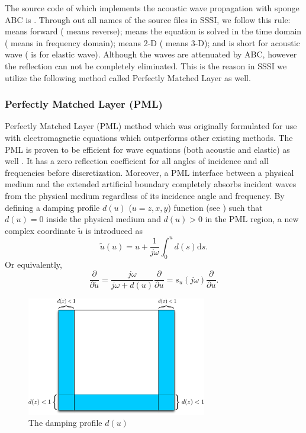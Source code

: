 \documentclass[11pt]{article}
\theoremstyle{plain}
\theoremstyle{definition}
\theoremstyle{remark}
\numberwithin{equation}{section}
\begin{document}
The source code of which implements the acoustic wave propagation with sponge ABC 
is . Through out all names of the source files in SSSI,  we follow this rule:  means forward ( means reverse);  means the equation is solved in the time domain ( means in frequency domain);  means 2-D ( means 3-D); and  is short
 for acoustic wave ( is for elastic wave).  Although the waves are attenuated by ABC, however the reflection can not be completely eliminated. This is the reason in SSSI we utilize the following method called Perfectly Matched Layer as well. 



\subsubsection{Perfectly Matched Layer (PML)}
 Perfectly Matched Layer (PML) method which was originally formulated for use with electromagnetic equations which outperforms other existing methods. The PML is proven to be efficient for wave equations (both acoustic and elastic) as well \cite{Komatitsch:2007aa}. It has a zero reflection coefficient for all angles of incidence and all frequencies before discretization. Moreover, a PML interface between a physical medium and the extended artificial boundary completely absorbs incident waves from the physical medium regardless of its incidence angle and frequency.
By defining a damping profile $d(u)$ ($u=z, x, y$) function (see ) such that $d(u) = 0$ inside the physical medium and $d(u) > 0$ in the PML region, a new complex coordinate $\tilde{u}$ is introduced as
  \begin{equation}
  \label{eq:replace}
  \tilde{u}(u) = u + \frac{1}{j\omega}\int_0^u d(s)\mathrm{d}s.
  \end{equation}
Or equivalently,
  \begin{equation}
  \frac{\partial}{\partial \tilde{u}} = \frac{j\omega}{j\omega + d(u)}\frac{\partial}{\partial u} = s_u(j\omega)\frac{\partial}{\partial u}.
  \end{equation} 
  
\begin{figure}[htbp]
\centering
\includegraphics[width=0.7\textwidth]{Fig/SpongeABC.pdf}
\caption{The damping profile $d(u)$}
\end{figure}
\end{document}
